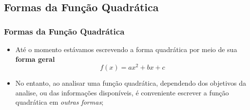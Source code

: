 \subsection{Formas da Função Quadrática}
\begin{frame}
  \frametitle{Formas da Função Quadrática}
  \begin{itemize}
    \item Até o momento estávamos escrevendo a forma quadrática por meio de sua \textbf{forma geral}
    \begin{equation*}
      f(x) = ax^{2} + bx + c
    \end{equation*}
    \item No entanto, ao analisar uma função quadrática, dependendo dos objetivos da analise, ou das informações disponíveis, é conveniente escrever a função quadrática em \emph{outras formas};
  \end{itemize}
  \begin{columns}[onlytextwidth]
    \begin{column}{0.49\textwidth}
      \begin{overlayarea}{\textwidth}{0.6\textheight}
      \end{overlayarea}
    \end{column}
    \begin{column}{0.49\textwidth}
      \begin{overlayarea}{\textwidth}{0.6\textheight}
\end{overlayarea}
\end{column}
\end{columns}
\end{frame}

